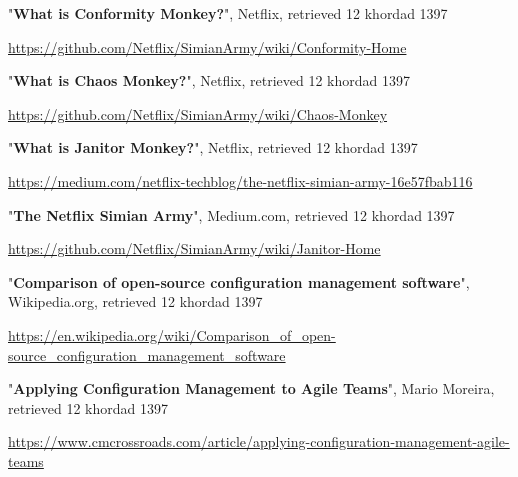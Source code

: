 \begin{thebibliography}{8}
\latin



"\textbf{What is Conformity Monkey?}", Netflix, retrieved 12 khordad 1397

\url{https://github.com/Netflix/SimianArmy/wiki/Conformity-Home}




"\textbf{What is Chaos Monkey?}", Netflix, retrieved 12 khordad 1397

\url{https://github.com/Netflix/SimianArmy/wiki/Chaos-Monkey}


"\textbf{What is Janitor Monkey?}", Netflix, retrieved 12 khordad 1397

\url{https://medium.com/netflix-techblog/the-netflix-simian-army-16e57fbab116}



"\textbf{The Netflix Simian Army}", Medium.com, retrieved 12 khordad 1397

\url{https://github.com/Netflix/SimianArmy/wiki/Janitor-Home}




"\textbf{Comparison of open-source configuration management software}", Wikipedia.org, retrieved 12 khordad 1397

\url{https://en.wikipedia.org/wiki/Comparison_of_open-source_configuration_management_software}




"\textbf{Applying Configuration Management to Agile Teams}", Mario Moreira, retrieved 12 khordad 1397

\url{https://www.cmcrossroads.com/article/applying-configuration-management-agile-teams}







\end{thebibliography}




